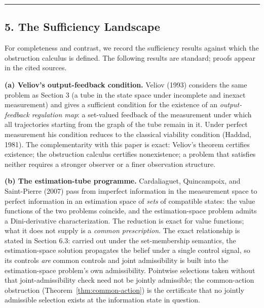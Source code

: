 \documentclass[11pt]{article}
\theoremstyle{definition}
\begin{document}
\begin{center}\rule{0.5\linewidth}{0.5pt}\end{center}

\subsection{5. The Sufficiency Landscape}\label{the-sufficiency-landscape-cited}

For completeness and contrast, we record the sufficiency results against
which the obstruction calculus is defined. The following results are standard; proofs appear in the cited sources.

\textbf{(a) Veliov's output-feedback condition.} Veliov (1993) considers the same problem as Section 3 (a tube in the state space under incomplete and inexact measurement) and gives a sufficient condition for the
existence of an \emph{output-feedback regulation map}: a set-valued
feedback of the measurement under which all trajectories starting from
the graph of the tube remain in it. Under perfect measurement his
condition reduces to the classical viability condition (Haddad, 1981).
The complementarity with this paper is exact: Veliov's theorem certifies
existence; the obstruction calculus certifies nonexistence; a problem that satisfies neither requires a stronger observer or a finer observation structure.

\textbf{(b) The estimation-tube programme.} Cardaliaguet, Quincampoix,
and Saint-Pierre (2007) pass from imperfect information in the
measurement space to perfect information in an estimation space of
\emph{sets} of compatible states: the value functions of the two
problems coincide, and the estimation-space problem admits a
Dini-derivative characterization. The reduction is exact for value
functions; what it does not supply is a \emph{common prescription}. The exact relationship is stated in Section 6.3: carried out under the set-membership semantics, the estimation-space solution propagates the belief under a single control signal, so its controls \emph{are} common controls and joint admissibility is built into the estimation-space problem's own admissibility. Pointwise selections taken without that joint-admissibility check need not be jointly admissible; the common-action obstruction (Theorem~\ref{thm:common-action}) is the certificate that no jointly admissible selection exists at the information state in question.
\end{document}
